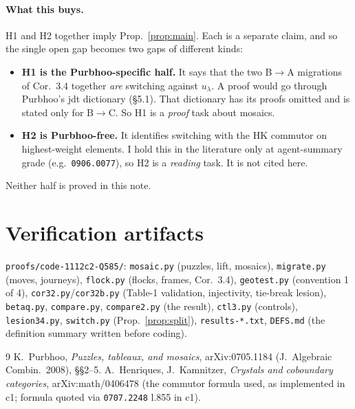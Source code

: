 \documentclass[11pt]{article}
\theoremstyle{definition}
\begin{document}
\paragraph{What this buys.} H1 and H2 together imply Prop.~\ref{prop:main}. Each is a separate claim, and so the single
open gap becomes two gaps of different kinds:
\begin{itemize}
\item \textbf{H1 is the Purbhoo-specific half.} It says that the two B$\to$A migrations of Cor.~3.4 together
\emph{are} switching against $u_\lambda$. A proof would go through Purbhoo's jdt dictionary (\S5.1). That dictionary
has its proofs omitted and is stated only for B$\to$C. So H1 is a \emph{proof} task about mosaics.
\item \textbf{H2 is Purbhoo-free.} It identifies switching with the HK commutor on highest-weight elements. I hold this
in the literature only at agent-summary grade (e.g.\ \texttt{0906.0077}), so H2 is a \emph{reading} task. It is not cited
here.
\end{itemize}
Neither half is proved in this note.

\section{Verification artifacts}
\texttt{proofs/code-1112c2-Q585/}: \texttt{mosaic.py} (puzzles, lift, mosaics), \texttt{migrate.py} (moves,
journeys), \texttt{flock.py} (flocks, frames, Cor.~3.4), \texttt{geotest.py} (convention 1 of 4),
\texttt{cor32.py}/\texttt{cor32b.py} (Table-1 validation, injectivity, tie-break lesion),
\texttt{betaq.py}, \texttt{compare.py}, \texttt{compare2.py} (the result), \texttt{ctl3.py} (controls),
\texttt{lesion34.py}, \texttt{switch.py} (Prop.~\ref{prop:split}), \texttt{results-*.txt}, \texttt{DEFS.md} (the definition summary written before coding).

\begin{thebibliography}{9}
 K.~Purbhoo, \emph{Puzzles, tableaux, and mosaics}, arXiv:0705.1184 (J.~Algebraic Combin.\ 2008), \S\S2--5.
 A.~Henriques, J.~Kamnitzer, \emph{Crystals and coboundary categories}, arXiv:math/0406478 (the commutor
formula used, as implemented in c1; formula quoted via \texttt{0707.2248} l.855 in c1).
\end{thebibliography}
\end{document}
